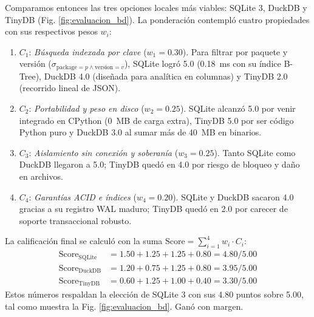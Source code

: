 \documentclass[conference]{IEEEtran}
\begin{document}
Comparamos entonces las tres opciones locales más viables: SQLite 3, DuckDB y TinyDB (Fig. \ref{fig:evaluacion_bd}). La ponderación contempló cuatro propiedades con sus respectivos pesos $w_i$:
\begin{enumerate}
    \item $C_1$: \textit{Búsqueda indexada por clave} ($w_1 = 0.30$). Para filtrar por paquete y versión ($\sigma_{\text{package}=p \land \text{version}=v}$), SQLite logró 5.0 (0.18~ms con su índice B-Tree), DuckDB 4.0 (diseñada para analítica en columnas) y TinyDB 2.0 (recorrido lineal de JSON).
    \item $C_2$: \textit{Portabilidad y peso en disco} ($w_2 = 0.25$). SQLite alcanzó 5.0 por venir integrado en CPython (0~MB de carga extra), TinyDB 5.0 por ser código Python puro y DuckDB 3.0 al sumar más de 40~MB en binarios.
    \item $C_3$: \textit{Aislamiento sin conexión y soberanía} ($w_3 = 0.25$). Tanto SQLite como DuckDB llegaron a 5.0; TinyDB quedó en 4.0 por riesgo de bloqueo y daño en archivos.
    \item $C_4$: \textit{Garantías ACID e índices} ($w_4 = 0.20$). SQLite y DuckDB sacaron 4.0 gracias a su registro WAL maduro; TinyDB quedó en 2.0 por carecer de soporte transaccional robusto.
\end{enumerate}

La calificación final se calculó con la suma $\text{Score} = \sum_{i=1}^4 w_i \cdot C_i$:
\begin{align*}
\text{Score}_{\text{SQLite}} &= 1.50 + 1.25 + 1.25 + 0.80 = \mathbf{4.80} / 5.00 \\
\text{Score}_{\text{DuckDB}} &= 1.20 + 0.75 + 1.25 + 0.80 = \mathbf{3.95} / 5.00 \\
\text{Score}_{\text{TinyDB}} &= 0.60 + 1.25 + 1.00 + 0.40 = \mathbf{3.30} / 5.00
\end{align*}
Estos números respaldan la elección de SQLite 3 con sus 4.80 puntos sobre 5.00, tal como muestra la Fig. \ref{fig:evaluacion_bd}. Ganó con margen.
\end{document}
